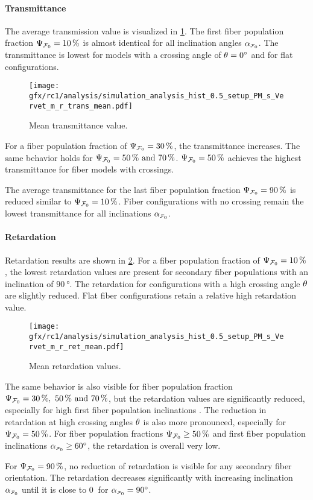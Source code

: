 \paragraph{Transmittance}
% 
The average transmission value is visualized in \cref{fig:sim_ana_trans}.
The first fiber population fraction $\textnormal{$\Psi_{\textnormal{$\mathcal{F}_0$}}$}=\SI{10}{\percent}$ is almost identical for all inclination angles $\modelInc$.
The transmittance is lowest for models with a crossing angle of $\textnormal{$\theta$} = \SI{0}{\degree}$ and for flat configurations.
\par
% 
\begin{figure}[!p]
\centering
\texttt{[image: gfx/rc1/analysis/simulation\_analysis\_hist\_0.5\_setup\_PM\_s\_Vervet\_m\_r\_trans\_mean.pdf]}
\caption{Mean transmittance value.}
\label{fig:sim_ana_trans}
\end{figure}
%
For a fiber population fraction of $\textnormal{$\Psi_{\textnormal{$\mathcal{F}_0$}}$}=\SI{30}{\percent}$, the transmittance increases.
The same behavior holds for $\modelPsi=\SIlist{50;70}{\percent}$.
$\textnormal{$\Psi_{\textnormal{$\mathcal{F}_0$}}$}=\SI{50}{\percent}$ achieves the highest transmittance for fiber models with crossings.
\par
% 
The average transmittance for the last fiber population fraction $\textnormal{$\Psi_{\textnormal{$\mathcal{F}_0$}}$}=\SI{90}{\percent}$ is reduced similar to $\textnormal{$\Psi_{\textnormal{$\mathcal{F}_0$}}$}=\SI{10}{\percent}$.
Fiber configurations with no crossing remain the lowest transmittance for all inclinations $\modelInc$.
%
% 
% 
\paragraph{Retardation}
% 
Retardation results are shown in \cref{fig:sim_ana_ret}.
For a fiber population fraction of $\textnormal{$\Psi_{\textnormal{$\mathcal{F}_0$}}$}=\SI{10}{\percent}$, the lowest retardation values are present for secondary fiber populations with an inclination of $\SI{90}{\degree}$.
The retardation for configurations with a high crossing angle $\textnormal{$\theta$}$ are slightly reduced.
Flat fiber configurations retain a relative high retardation value.
\par
% 
\begin{figure}[!p]
\centering
\texttt{[image: gfx/rc1/analysis/simulation\_analysis\_hist\_0.5\_setup\_PM\_s\_Vervet\_m\_r\_ret\_mean.pdf]}
\caption{Mean retardation values.}
\label{fig:sim_ana_ret}
\end{figure}
%
The same behavior is also visible for fiber population fraction $\modelPsi=\SIlist{30;50;70}{\percent}$, but the retardation values are significantly reduced, especially for high first fiber population inclinations \modelInc{}.
The reduction in retardation at high crossing angles $\textnormal{$\theta$}$ is also more pronounced, especially for $\textnormal{$\Psi_{\textnormal{$\mathcal{F}_0$}}$}=\SI{50}{\percent}$.
For fiber population fractions $\textnormal{$\Psi_{\textnormal{$\mathcal{F}_0$}}$} \geq \SI{50}{\percent}$ and first fiber population inclinations $\modelInc \geq \SI{60}{\degree}$, the retardation is overall very low.
\par
%
For $\textnormal{$\Psi_{\textnormal{$\mathcal{F}_0$}}$}=\SI{90}{\percent}$, no reduction of retardation is visible for any secondary fiber orientation.
The retardation decreases significantly with increasing inclination $\modelInc$ until it is close to $\SI{0}{}$ for $\modelInc=\SI{90}{\degree}$.
% 
% 
% 

